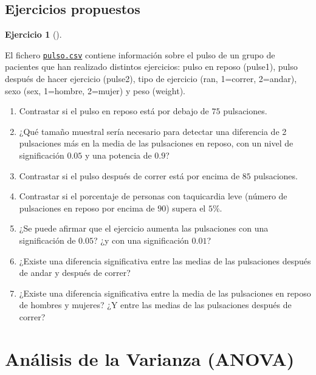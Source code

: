 \documentclass[
  a4paper,
]{scrreport}
\theoremstyle{definition}
\newtheorem{exercise}{Ejercicio}[chapter]
\theoremstyle{remark}
\begin{document}
\hypertarget{ejercicios-propuestos-6}{%
\section{Ejercicios propuestos}\label{ejercicios-propuestos-6}}

\begin{exercise}[]\protect\hypertarget{exr-contraste-hipotesis-pulso}{}\label{exr-contraste-hipotesis-pulso}

El fichero
\href{https://aprendeconalf.es/estadistica-practicas-r/datos/pulso.csv}{\texttt{pulso.csv}}
contiene información sobre el pulso de un grupo de pacientes que han
realizado distintos ejercicios: pulso en reposo (pulse1), pulso después
de hacer ejercicio (pulse2), tipo de ejercicio (ran, 1=correr, 2=andar),
sexo (sex, 1=hombre, 2=mujer) y peso (weight).

\begin{enumerate}
\def\labelenumi{\alph{enumi}.}
\item
  Contrastar si el pulso en reposo está por debajo de \(75\)
  pulsaciones.
\item
  ¿Qué tamaño muestral sería necesario para detectar una diferencia de 2
  pulsaciones más en la media de las pulsaciones en reposo, con un nivel
  de significación \(0.05\) y una potencia de \(0.9\)?
\item
  Contrastar si el pulso después de correr está por encima de \(85\)
  pulsaciones.
\item
  Contrastar si el porcentaje de personas con taquicardia leve (número
  de pulsaciones en reposo por encima de \(90\)) supera el \(5\%\).
\item
  ¿Se puede afirmar que el ejercicio aumenta las pulsaciones con una
  significación de \(0.05\)? ¿y con una significación \(0.01\)?
\item
  ¿Existe una diferencia significativa entre las medias de las
  pulsaciones después de andar y después de correr?
\item
  ¿Existe una diferencia significativa entre la media de las pulsaciones
  en reposo de hombres y mujeres? ¿Y entre las medias de las pulsaciones
  después de correr?
\end{enumerate}

\end{exercise}


\hypertarget{anuxe1lisis-de-la-varianza-anova}{%
\chapter{Análisis de la Varianza
(ANOVA)}\label{anuxe1lisis-de-la-varianza-anova}}
\end{document}
